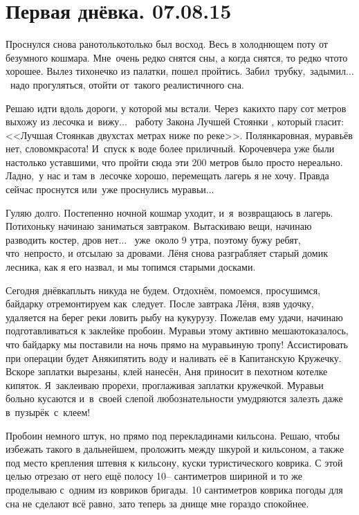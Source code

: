 \chapter{Первая днёвка. 07.08.15}

Проснулся снова рано\mdash только\sdash только был восход. Весь в холоднющем поту от безумного кошмара. Мне~очень редко снятся сны, а когда снятся, то редко что\sdash то хорошее. Вылез тихонечко из палатки, пошел пройтись. Забил~трубку,~задымил$\ldots$ ~надо прогуляться, отойти от~такого реалистичного сна.

Решаю идти вдоль дороги, у которой мы встали. Через~каких\sdash то пару сот метров выхожу из лесочка и~вижу$\ldots$~ работу Закона Лучшей Стоянки \cite{Квадригин}, который гласит: <<Лучшая Стоянка\mdash в двухстах метрах ниже по реке>>. Полянка\mdash ровная, муравьёв нет, словом\mdash красота! И~спуск к воде более приличный. Короче\mdash вчера уже были настолько уставшими, что пройти сюда эти 200 метров было просто нереально. Ладно,~у нас и там в~лесочке хорошо, перемещать лагерь я не хочу. Правда сейчас проснутся или~уже проснулись муравьи$\ldots$

Гуляю долго. Постепенно ночной кошмар уходит, и~я~возвращаюсь в лагерь. Потихоньку начинаю заниматься завтраком. Вытаскиваю вещи, начинаю разводить костер, дров нет$\ldots$~ уже~около 9 утра, поэтому бужу ребят, что~непросто, и отсылаю за дровами. Лёня снова разграбляет старый домик лесника, как я его назвал, и мы топимся старыми досками. 

Сегодня днёвка\mdash плыть никуда не будем. Отдохнём, помоемся, просушимся, байдарку отремонтируем как~следует. После завтрака Лёня, взяв удочку, удаляется на берег реки ловить рыбу на кукурузу. Пожелав ему удачи, начинаю подготавливаться к заклейке пробоин. Муравьи этому активно мешают\mdash оказалось, что байдарку мы поставили на ночь прямо на муравьиную тропу! Ассистировать при операции будет Аня\mdash кипятить воду и наливать её в Капитанскую Кружечку. Вскоре заплатки вырезаны, клей нанесён, Аня приносит в пехотном котелке кипяток. Я~заклеиваю прорехи, проглаживая заплатки кружечкой. Муравьи больно кусаются и~в~своей слепой любознательности умудряются залезть даже в~пузырёк~с~клеем! 

Пробоин немного штук, но прямо под перекладинами кильсона. Решаю, чтобы избежать такого в дальнейшем, проложить между шкурой и кильсоном, а также под место крепления штевня к кильсону, куски туристического коврика. С этой целью отрезаю от него ещё полосу 10\thinspace-- сантиметров шириной и то же проделываю с~одним из ковриков бригады. 10 сантиметров коврика погоды для сна не сделают всё равно, зато теперь за днище мне гораздо спокойнее. 

